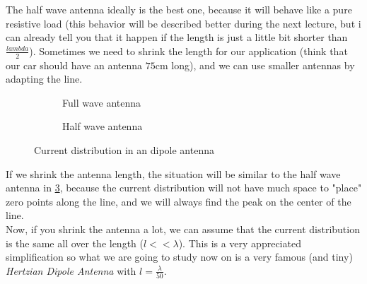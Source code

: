 The half wave antenna ideally is the best one, because it will behave like a pure resistive load\cite{Antenne_appunti_tlc} (this behavior will be described better during the next lecture, but i can already tell you that it happen if the length is just a little bit shorter than $\frac{lambda}{2}$). Sometimes we need to shrink the length for our application (think that our car should have an antenna $75\si{\centi\metre}$ long), and we can use smaller antennas by adapting the line.
\begin{figure}[H]
        \centering
        \begin{subfigure}[b]{0.45\textwidth}\centering
        \caption{Full wave antenna}\label{fig:Full_wave_antenna} 
    \end{subfigure}%
    \hfill
    \begin{subfigure}[b]{0.45\textwidth}\centering
        \caption{Half wave antenna}\label{fig:Half_wave_antenna}
    \end{subfigure}\caption{Current distribution in an dipole antenna}
\end{figure}
If we shrink the antenna length, the situation will be similar to the half wave antenna in \cref{fig:Half_wave_antenna}, because the current distribution will not have much space to "place" zero points along the line, and we will always find the peak on the center of the line.\\
Now, if you shrink the antenna a lot, we can assume that the current distribution is the same all over the length ($l<<\lambda$). This is a very appreciated simplification so what we are going to study now on is a very famous (and tiny) \emph{Hertzian Dipole Antenna} with $l=\frac{\lambda}{50}$.
